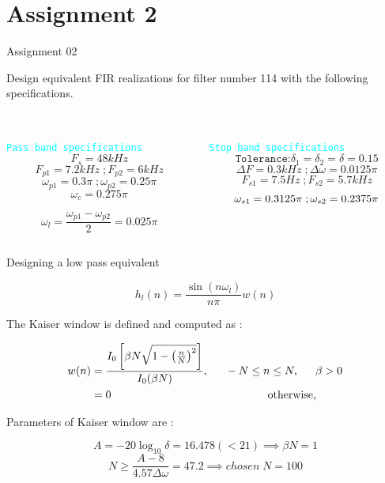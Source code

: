 \documentclass[notheorems]{beamer}
\begin{document}
\section{Assignment 2}

\begin{frame}{Assignment 02}

Design equivalent FIR realizations for filter number 114 with the following specifications.

\begin{columns}
\begin{column}[t]{0.5\textwidth}
\dotfill\\
\texttt{\textcolor{cyan}{Pass band specifications}}\\

$$F_{s} = 48kHz $$
$$F_{p1} = 7.2kHz \; ; F_{p2} = 6kHz $$
$$ \omega_{p1} = 0.3 \pi \; ; \omega_{p2} = 0.25 \pi  $$
$$ \omega_{c}  = 0.275\pi $$

$$\omega_l = \frac{\omega_{p1} - \omega_{p2}}{2} = 0.025 \pi$$

\dotfill
\end{column}\vrule \hfill

\begin{column}[t]{0.5\textwidth}
\dotfill\\

\texttt{\textcolor{cyan}{Stop band specifications}}\\

$$ \texttt{Tolerance:} \delta_1 = \delta_2 = \delta = 0.15 $$
$$ \Delta F = 0.3  kHz \; ; \Delta \omega = 0.0125\pi $$
$$F_{s1} = 7.5Hz \; ; F_{s2} = 5.7kHz $$
$$ \omega_{s1} = 0.3125 \pi \; ; \omega_{s2} = 0.2375 \pi \\ $$

\dotfill
\end{column}
\end{columns}
\end{frame}

\begin{frame}{Designing a low pass equivalent}

\begin{equation}
h_l(n) = \frac{\sin(n\omega_l)}{n\pi}w(n)
\end{equation}

The Kaiser window is defined and computed as :

\begin{align*}
w(n) &= \frac{I_0\left[ \beta N \sqrt{1 - \left(\frac{n}{N}\right)^2} \right]}{I_0(\beta N)},
\indent -N \leq n \leq N, \indent \beta > 0 \nonumber  \\
	&=  0 \hspace{5cm} \mbox{otherwise,}
\end{align*}

Parameters of Kaiser window are : 

$$ A =  -20\log_{10}\delta =  16.478 (< 21) \implies \beta N = 1 $$
$$   N \geq \frac{A-8}{4.57\Delta \omega} = 47.2 \implies chosen \;  N = 100 $$


\end{frame}
\end{document}
